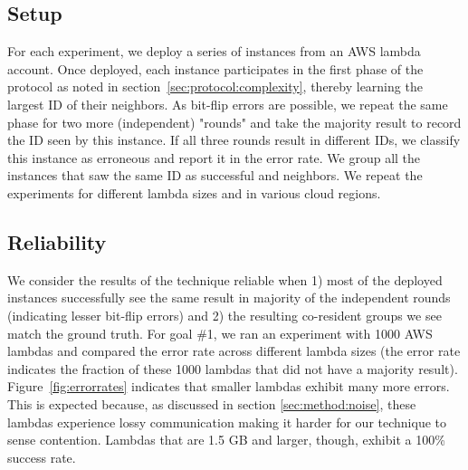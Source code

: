 \subsection{Setup}
\label{subsec:expsetup}
For each experiment, we deploy a series of instances from an AWS lambda
account. Once deployed, each instance participates in the first phase of the
protocol as noted in section~\ref{sec:protocol:complexity}, thereby learning the
largest ID of their neighbors. As bit-flip errors are possible, we repeat the
same phase for two more (independent) "rounds" and take the majority result to
record the ID seen by this instance.  If all three rounds result in different
IDs, we classify this instance as erroneous and report it in the error rate. We
group all the instances that saw the same ID as successful and neighbors. We
repeat the experiments for different lambda sizes and in various cloud regions.

\subsection{Reliability}
We consider the results of the technique reliable when 1) most of the deployed
instances successfully see the same result in majority of the independent rounds
(indicating lesser bit-flip errors) and 2) the resulting co-resident groups we
see match the ground truth.  For goal \#1, we ran an experiment with 1000 AWS
lambdas and compared the error rate across different lambda sizes (the error
rate indicates the fraction of these 1000 lambdas that did not have a majority
result). Figure~\ref{fig:errorrates} indicates that smaller lambdas exhibit many
more errors.  This is expected because, as discussed in section
\ref{sec:method:noise}, these lambdas experience lossy communication making it
harder for our technique to sense contention. Lambdas that are 1.5 GB and
larger, though, exhibit a 100\% success rate.

